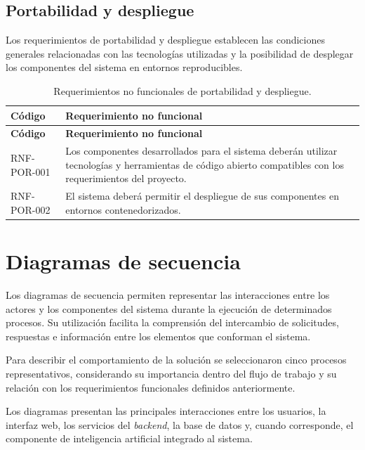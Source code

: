 \subsection{Portabilidad y despliegue}
\label{subsec:rnf-portabilidad}

Los requerimientos de portabilidad y despliegue establecen las condiciones
generales relacionadas con las tecnologías utilizadas y la posibilidad de
desplegar los componentes del sistema en entornos reproducibles.

\begin{longtable}{|p{}|p{}|}
    \caption{Requerimientos no funcionales de portabilidad y despliegue.}
    \label{tab:rnf-portabilidad}\\
    \hline
    \textbf{Código} & \textbf{Requerimiento no funcional} \\
    \hline
    \endfirsthead

    \hline
    \textbf{Código} & \textbf{Requerimiento no funcional} \\
    \hline
    \endhead

    RNF-POR-001 &
    Los componentes desarrollados para el sistema deberán utilizar tecnologías
    y herramientas de código abierto compatibles con los requerimientos del
    proyecto. \\
    \hline

    RNF-POR-002 &
    El sistema deberá permitir el despliegue de sus componentes en entornos
    contenedorizados. \\
    \hline
\end{longtable}


\section{Diagramas de secuencia}
\label{sec:diagramas-secuencia}

Los diagramas de secuencia permiten representar las interacciones
entre los actores y los componentes del sistema durante la ejecución
de determinados procesos. Su utilización facilita la comprensión
del intercambio de solicitudes, respuestas e información entre
los elementos que conforman el sistema.

Para describir el comportamiento de la solución se seleccionaron cinco procesos representativos, considerando su importancia dentro del flujo de trabajo y su relación con los requerimientos funcionales definidos anteriormente.

Los diagramas presentan las principales interacciones entre
los usuarios, la interfaz web, los servicios del \textit{backend},
la base de datos y, cuando corresponde, el componente de
inteligencia artificial integrado al sistema.

